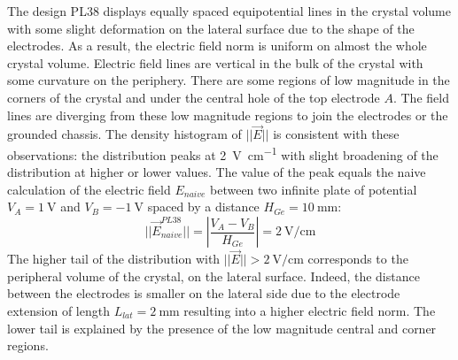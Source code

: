 The design PL38 displays equally spaced equipotential lines in the crystal volume with some slight deformation on the lateral surface due to the shape of the electrodes. As a result, the electric field norm is uniform on almost the whole crystal volume. Electric field lines are vertical in the bulk of the crystal with some curvature on the periphery. There are some regions of low magnitude in the corners of the crystal and under the central hole of the top electrode $A$. The field lines are diverging from these low magnitude regions to join the electrodes or the grounded chassis. The density histogram of $||\vec{E}||$ is consistent with these observations: the distribution peaks at \SI{2}{\volt\per\cm} with slight broadening of the distribution at higher or lower values. The value of the peak equals the naive calculation of the electric field $E_{naive}$ between two infinite plate of potential $V_A=\SI{+1}{\volt}$ and $V_B=\SI{-1}{\volt}$ spaced by a distance $H_{Ge}=\SI{10}{\mm}$:
\begin{equation}
\label{eq:pl38-naive-efield}
|| \vec{E}_{naive}^{PL38} || = \left| \frac{V_A - V_B}{H_{Ge}} \right| = \SI{2}{\volt\per\cm}
\end{equation}
The higher tail of the distribution with $||\vec{E}||> \SI{2}{\volt\per\cm}$ corresponds to the peripheral volume of the crystal, on the lateral surface. Indeed, the distance between the electrodes is smaller on the lateral side due to the electrode extension of length $L_{lat} = \SI{2}{\mm}$ resulting into a higher electric field norm. The lower tail is explained by the presence of the low magnitude central and corner regions.

